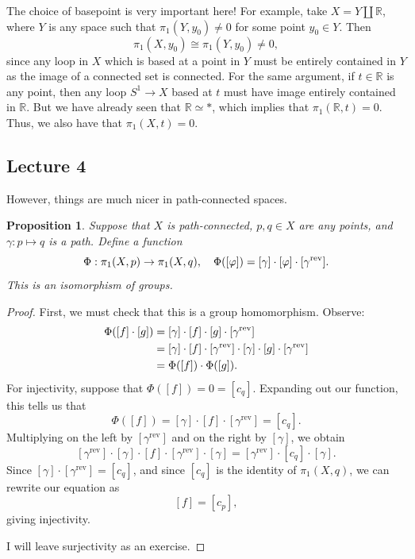 \documentclass[10pt]{amsart}
\newtheorem{proposition}[thm]{Proposition}
\theoremstyle{definition}
\begin{document}
The choice of basepoint is very important here! For example, take $X = Y \amalg \mathbb{R}$, where $Y$ is any space such that $\pi_1(Y, y_0) \neq 0$ for some point $y_0 \in Y$. Then 
\[
\pi_1(X, y_0) \cong\pi_1(Y, y_0) \neq 0,
\]
since any loop in $X$ which is based at a point in $Y$ must be entirely contained in $Y$ as the image of a connected set is connected. For the same argument, if $t \in \mathbb{R}$ is any point, then any loop $S^1 \to X$ based at $t$ must have image entirely contained in $\mathbb{R}$. But we have already seen that $\mathbb{R} \simeq *$, which implies that $\pi_1(\mathbb{R}, t) = 0$. Thus, we also have that $\pi_1(X, t) = 0$.

\subsection*{Lecture 4}
\hfill

However, things are much nicer in path-connected spaces.

\begin{proposition}
    Suppose that $X$ is path-connected, $p, q \in X$ are any points, and $\gamma:p \mapsto q$ is a path. Define a function
    \[\Phi:\pi_1(X, p) \to \pi_1(X, q), \quad \Phi([\varphi]) = [\gamma]\cdot[\varphi] \cdot[\gamma^\textup{rev}].\]
    This is an isomorphism of groups.
\end{proposition}

\begin{proof}
    First, we must check that this is a group homomorphism. Observe:
    \begin{align*}
        \Phi([f] \cdot[g]) &= [\gamma] \cdot[f] \cdot [g] \cdot [\gamma^\text{rev}] \\
         &= [\gamma] \cdot [f] \cdot [\gamma^\text{rev}] \cdot [\gamma] \cdot [g] \cdot [\gamma^\textup{rev}] \\
         &= \Phi([f]) \cdot \Phi([g]).
    \end{align*}
    For injectivity, suppose that $\Phi([f]) = 0 = [c_q]$. Expanding out our function, this tells us that
    \[
    \Phi([f]) = [\gamma] \cdot [f] \cdot [\gamma^\text{rev}] = [c_q].
    \]
    Multiplying on the left by $[\gamma^\text{rev}]$ and on the right by $[\gamma]$, we obtain
    \[
    [\gamma^\text{rev}] \cdot [\gamma] \cdot [f] \cdot [\gamma^\text{rev}] \cdot [\gamma] = [\gamma^\text{rev}] \cdot [c_q] \cdot [\gamma].
    \]
    Since $[\gamma] \cdot [\gamma^{\text{rev}}] = [c_q]$, and since $[c_q]$ is the identity of $\pi_1(X, q)$, we can rewrite our equation as
    \[
    [f] = [c_p],
    \]
    giving injectivity.

    I will leave surjectivity as an exercise.
\end{proof}
\end{document}
